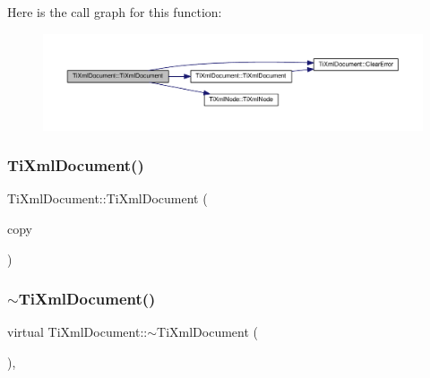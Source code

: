Here is the call graph for this function\+:
\nopagebreak
\begin{figure}[H]
\begin{center}
\leavevmode
\includegraphics[width=350pt]{class_ti_xml_document_ae4508b452d0c3061db085f3db27b8396_cgraph}
\end{center}
\end{figure}
\mbox{\label{class_ti_xml_document_a323a7486e7da6099cdc19a5ff7e74b07}} 
\subsubsection{\texorpdfstring{Ti\+Xml\+Document()}{TiXmlDocument()}\hspace{0.1cm}{\footnotesize\ttfamily [3/3]}}
{\footnotesize\ttfamily Ti\+Xml\+Document\+::\+Ti\+Xml\+Document (\begin{DoxyParamCaption}\item[{const \hyperlink{class_ti_xml_document}{Ti\+Xml\+Document} \&}]{copy }\end{DoxyParamCaption})}

\mbox{\label{class_ti_xml_document_a1b8a035c2c2aab38e4387246a0b712c5}} 
\subsubsection{\texorpdfstring{$\sim$\+Ti\+Xml\+Document()}{~TiXmlDocument()}}
{\footnotesize\ttfamily virtual Ti\+Xml\+Document\+::$\sim$\+Ti\+Xml\+Document (\begin{DoxyParamCaption}{ }\end{DoxyParamCaption})\hspace{0.3cm}{\ttfamily [inline]}, {\ttfamily [virtual]}}



